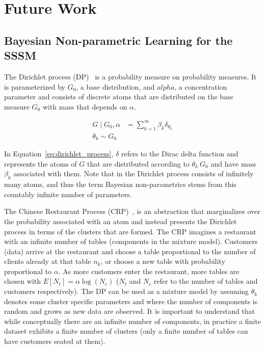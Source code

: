 \section{Future Work}
\subsection{Bayesian Non-parametric Learning for the SSSM}\label{sec:non-parameteric}
The Dirichlet process (DP)~\cite{ferguson1973bayesian} is a probability measure on probability measures. It is parameterized by $G_0$, a base distribution, and $alpha$, a concentration parameter and consists of discrete atoms that are distributed on the base measure $G_0$ with mass that depends on $\alpha$.

\begin{equation}\label{eq:dirichlet_process}
  \begin{split}
    G \mid G_0, \alpha &= \sum\limits_{k=1}^{\infty} \beta_k \delta_{\theta_k} \\
    \theta_k \sim G_0
  \end{split}
\end{equation}

In Equation~\ref{eq:dirichlet_process}, $\delta$ refers to the Dirac delta function and represents the atoms of $G$ that are distributed according to $\theta_k ~ G_0$ and have mass $\beta_k$ associated with them. Note that in the Dirichlet process consists of infinitely many atoms, and thus the term Bayesian non-parametrics stems from this countably infinite number of parameters.

The Chinese Restaurant Process (CRP)~\citep{neal2000markov, gershman2012tutorial}, is an abstraction that marginalizes over the probability associated with an atom and instead presents the Dirichlet process in terms of the clusters that are formed. The CRP imagines a restaurant with an infinite number of tables (components in the mixture model). Customers (data) arrive at the restaurant and choose a table proportional to the number of clients already at that table $n_k$, or choose a new table with probability proportional to $\alpha$. As more customers enter the restaurant, more tables are chosen with $E[N_t] = \alpha \log(N_c)$ ($N_t$ and $N_c$ refer to the number of tables and customers respectively). The DP can be used as a mixture model by assuming $\theta_k$ denotes some cluster specific parameters and where the number of components is random and grows as new data are observed. It is important to understand that while conceptually there are an infinite number of components, in practice a finite dataset exhibits a finite number of clusters (only a finite number of tables can have customers seated at them).

